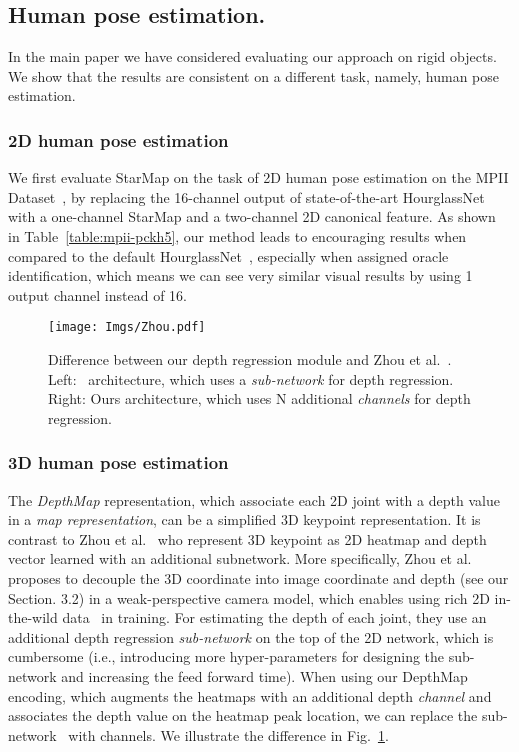 \documentclass[runningheads]{llncs}
\begin{document}
\subsection{Human pose estimation.} 
In the main paper we have considered evaluating our approach on rigid objects. We show that the results are consistent on a different task, namely, human pose estimation. 

\subsubsection{2D human pose estimation}
We first evaluate StarMap on the task of 2D human pose estimation on the MPII Dataset~\cite{andriluka14cvpr}, by replacing the 16-channel output of state-of-the-art HourglassNet~\cite{newell2016stacked} with a one-channel StarMap and a two-channel 2D canonical feature. 
As shown in Table~\ref{table:mpii-pckh5}, our method leads to encouraging results when compared to the default HourglassNet~\cite{newell2016stacked}, especially when assigned oracle identification, which means we can see very similar visual results by using 1 output channel instead of 16.

\begin{figure}[t]
\centering
\texttt{[image: Imgs/Zhou.pdf]}
\caption{Difference between our depth regression module and Zhou et al.~\cite{Zhou_2017_ICCV}. Left:~\cite{Zhou_2017_ICCV} architecture, which uses a \emph{sub-network} for depth regression. Right: Ours architecture, which uses N additional \emph{channels} for depth regression.}
\label{fig:zhou}
\vspace{-0.3cm}
\end{figure}

\subsubsection{3D human pose estimation}
The \emph{DepthMap} representation, which associate each 2D joint with a depth value in a \emph{map representation}, 
can be a simplified 3D keypoint representation. 
It is contrast to Zhou et al.~\cite{Zhou_2017_ICCV} who represent 3D keypoint as 2D heatmap and depth vector learned with an additional subnetwork.
More specifically, Zhou et al.~\cite{Zhou_2017_ICCV} proposes to decouple the  3D coordinate into  image coordinate and depth  (see our Section. 3.2) in a weak-perspective camera model,
which enables using rich 2D in-the-wild data~\cite{andriluka14cvpr} in training. 
For estimating the depth  of each joint, they use an additional depth regression \emph{sub-network} on the top of the 2D network, which is cumbersome (i.e., introducing more hyper-parameters for designing the sub-network and increasing the feed forward time). 
When using our DepthMap encoding, which augments the  heatmaps with an additional depth \emph{channel} and associates the depth value on the heatmap peak location, 
we can replace the sub-network~\cite{Zhou_2017_ICCV} with channels.
We illustrate the difference in Fig.~\ref{fig:zhou}. 
\end{document}
